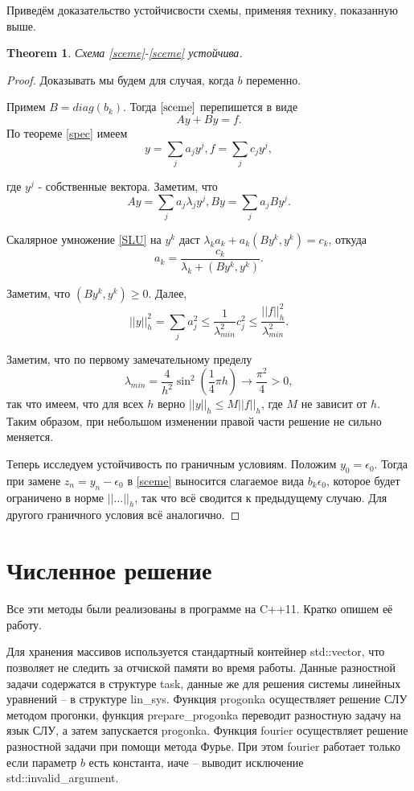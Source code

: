 \documentclass[12 pt, russian]{article}
\newtheorem{theo}{Theorem}[section]
\newcommand\beq{\begin{equation}}
\newcommand\eeq{\end{equation}}
\begin{document}
Приведём доказательство устойчисвости схемы, применяя технику, показанную выше.
\begin{theo}
Схема \eqref{sceme}-\eqref{sceme} устойчива.
\end{theo}
\begin{proof}
Доказывать мы будем для случая, когда $b$ переменно.

Примем $B = diag(b_k)$. Тогда $\eqref{sceme}$ перепишется в виде 
\beq
\label{SLU}
Ay + By = f.
\eeq
По теореме \ref{spec} имеем
\beq
y = \sum_j a_j y^j,
f = \sum_j c_j y^j,
\eeq

где $y^j$ - собственные вектора.  Заметим, что
\beq
Ay =  \sum_j a_j \lambda_j y^j,
By =  \sum_j a_j By^j.
\eeq

Скалярное умножение \eqref{SLU} на $y^k$ даст $\lambda_k a_k + a_k (By^k, y^k) = c_k$, откуда
\beq
a_k = \frac{c_k}{\lambda_k + (By^k, y^k)}.
\eeq

Заметим, что $(By^k, y^k) \geq 0$. Далее,
\beq
||y||_h^2 = \sum_j a_j^2 \leq \frac{1}{\lambda_{min}^2} c_j^2 \leq  \frac{||f||_h^2}{\lambda_{min}^2}.
\eeq

Заметим, что по первому замечательному пределу
\beq
\lambda_{min} = \frac{4}{h^2} \sin^2(\frac{1}{4} \pi h ) \rightarrow \frac{\pi^2}{4} > 0,
\eeq
так что имеем, что для всех $h$ верно $||y||_h \leq M||f||_h$, где $M$ не зависит от $h$. Таким образом, при небольшом изменении правой части решение не сильно меняется. 

Теперь исследуем устойчивость по граничным условиям. Положим $y_0 = \epsilon_0$. Тогда при замене $z_n = y_n - \epsilon_0$ в \eqref{sceme} выносится слагаемое вида $b_k \epsilon_0$, которое будет ограничено в норме $|| \dots ||_h$, так что всё сводится к предыдущему случаю. Для другого граничного условия всё аналогично.

\end{proof}

\section{Численное решение}

Все эти методы были реализованы в программе на C++11. Кратко опишем её работу.

Для хранения массивов используется стандартный контейнер std::vector, что позволяет не следить за отчиской памяти во время работы. Данные разностной задачи содержатся в структуре task, данные же для решения системы линейных уравнений -- в структуре lin\_sys. Функция progonka осуществляет решение СЛУ методом прогонки, функция prepare\_progonka переводит разностную задачу на язык СЛУ, а затем запускается progonka. Функция fourier осуществляет решение разностной задачи при помощи метода Фурье. При этом fourier работает только если параметр $b$ есть константа, иаче -- выводит исключение std::invalid\_argument. 
\end{document}
